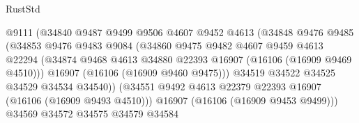 \begin{lexlean}{RustStd}
\begin{coremodule}
                                      @9111
                                      (@34840
                                        @9487
                                        @9499
                                        @9506
                                        @4607
                                        @9452
                                        @4613
                                        (@34848
                                          @9476
                                          @9485
                                          (@34853
                                            @9476
                                            @9483
                                            @9084
                                            (@34860
                                              @9475
                                              @9482
                                              @4607
                                              @9459
                                              @4613
                                              @22294
                                              (@34874
                                                @9468
                                                @4613
                                                @34880
                                                @22393
                                                @16907
                                                (@16106 (@16909 @9469 @4510)))
                                              @16907
                                              (@16106 (@16909 @9460 @9475)))
                                            @34519
                                            @34522
                                            @34525
                                            @34529
                                            @34534
                                            @34540))
                                        (@34551
                                          @9492
                                          @4613
                                          @22379
                                          @22393
                                          @16907
                                          (@16106 (@16909 @9493 @4510)))
                                        @16907
                                        (@16106 (@16909 @9453 @9499)))
                                      @34569
                                      @34572
                                      @34575
                                      @34579
                                      @34584

\end{coremodule}
\end{lexlean}
